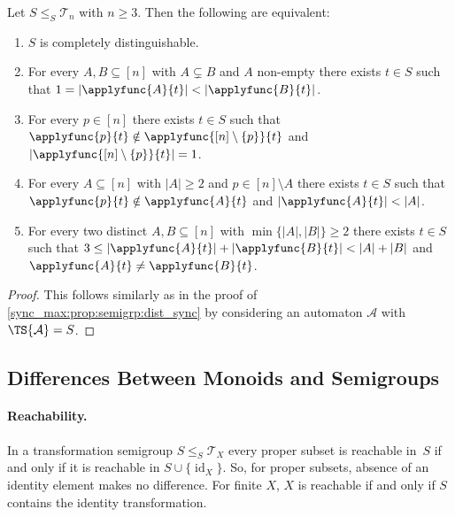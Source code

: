 \begin{theorem}
	\label{sync_max:thm:semigrp:char_distinguishable}
	Let $S \le_S \mathcal T_n$ with $n \ge 3$.
	Then the following are equivalent:
	\begin{enumerate}	
		\item \label{dist:ts:item:all_pairs}
		$S$ is completely distinguishable.		
		
		\item \label{dist:ts:item:subsets} For every $A, B \subseteq [n]$
		with $A \subsetneq B$ and $A$ non-empty
		there exists $t \in S$ such that $1 = |\applyfunc{A}{t}| < |\applyfunc{B}{t}|$.
		
				
		\item \label{dist:ts:item:single_point} For every $p \in [n]$ there exists $t \in S$ such that
		$\applyfunc{p}{t} \notin \applyfunc{[n] \setminus \{p\}}{t}$ and
		$|\applyfunc{[n] \setminus \{p\}}{t}| = 1$.
				
		\item \label{dist:ts:item:compress} For every $A \subseteq [n]$
		with $|A| \ge 2$ and $p \in [n] \setminus A$
		there exists $t \in S$
		such that $\applyfunc{p}{t} \notin \applyfunc{A}{t}$
		and $|\applyfunc{A}{t}| < |A|$. 
		
		\item \label{dist:ts:item:dcps} For every two distinct $A, B \subseteq [n]$ 
		with $\min\{ |A|, |B|\} \ge 2$ 
		there exists $t \in S$
		such that $3 \le |\applyfunc{A}{t}| + |\applyfunc{B}{t}| < |A| + |B|$
		and $\applyfunc{A}{t} \ne \applyfunc{B}{t}$.		
	\end{enumerate}
\end{theorem}
\begin{proof}
 This follows similarly as in the proof of \cref{sync_max:prop:semigrp:dist_sync}
 by considering an automaton $\mathcal A$ with $\TS{\mathcal A} = S$.
\end{proof}


\subsection{Differences Between Monoids and Semigroups}
\label{sync_max:sec:diff} 


\paragraph{Reachability.} In a transformation semigroup $S \le_S \mathcal T_X$ every proper
subset is reachable in~$S$ if and only if it is reachable in $S \cup \{ \operatorname{id}_X \}$. So, for proper subsets, absence of an identity
element makes no difference. For finite $X$,
$X$ is reachable if and only if $S$ contains the identity transformation.

